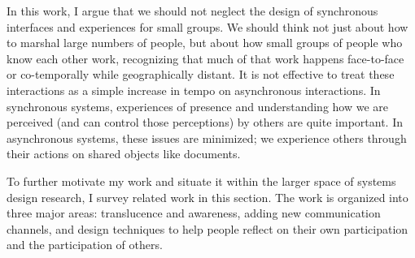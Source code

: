 \documentclass{tufte-handout}
\begin{document}
In this work, I argue that we should not neglect the design of synchronous interfaces and experiences for small groups. We should think not just about how to marshal large numbers of people, but about how small groups of people who know each other work, recognizing that much of that work happens face-to-face or co-temporally while geographically distant. It is not effective to treat these interactions as a simple increase in tempo on asynchronous interactions. In synchronous systems, experiences of presence and understanding how we are perceived (and can control those perceptions) by others are quite important. In asynchronous systems, these issues are minimized; we experience others through their actions on shared objects like documents.


To further motivate my work and situate it within the larger space of systems design research, I survey related work in this section. The work is organized into three major areas: translucence and awareness, adding new communication channels, and design techniques to help people reflect on their own participation and the participation of others.





\end{document}
